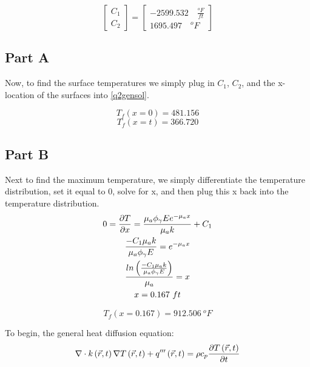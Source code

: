 \documentclass{article}
\begin{document}
\begin{equation}
    \begin{bmatrix}
        C_1 \\ C_2
    \end{bmatrix}
     = 
     \begin{bmatrix}
         -2599.532 \quad \frac{^oF}{ft}\\ 1695.497  \quad ^oF
     \end{bmatrix}
\end{equation}


\subsection*{Part A}
Now, to find the surface temperatures we simply plug in $C_1$, $C_2$, and the x-location of the surfaces into \eqref{q2gensol}. 

\[
\boxed{T_f(x = 0) = 481.156} \]\[
\boxed{T_f(x = t) = 366.720}
\]

\subsection*{Part B}
Next to find the maximum temperature, we simply differentiate the temperature distribution, set it equal to 0, solve for x, and then plug this x back into the temperature distribution. 
\begin{equation}
    \begin{gathered}
        0 = \frac{\partial T}{\partial x} = \frac{\mu_a \phi_{\gamma} E e^{-\mu_a x}}{\mu_ak}+C_1 \\
    \frac{-C_1 \mu_a k}{\mu_a \phi_{\gamma} E} = e^{-\mu_a x} \\
    \frac{ln\left(\frac{-C_1 \mu_a k}{\mu_a \phi_{\gamma} E}\right)}{\mu_a} = x \\
    x = 0.167 \ ft
    \end{gathered}
\end{equation}    

\[
\boxed{T_f(x = 0.167) = 912.506 \ ^oF}
\]











\newpage
{}
To begin, the general heat diffusion equation:
\begin{equation}
    \nabla \cdot k\left(\Vec{r},t\right) \nabla T \left(\Vec{r},t\right) + q'''\left(\Vec{r},t\right) = \rho c_p \frac{\partial T \left(\Vec{r},t\right)}{\partial t}
\end{equation}
\end{document}
